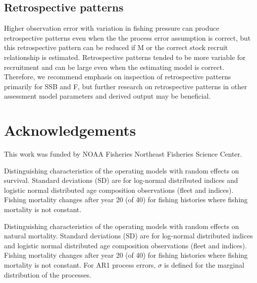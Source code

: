 \documentclass[
  12pt,
]{article}
\newlength{\cslhangindent}
\newlength{\cslentryspacingunit} %
\newenvironment{CSLReferences}[2] %
 {%
  \setlength{\parindent}{0pt}
  \ifodd #1
  \let\oldpar\par
  \def\par{\hangindent=\cslhangindent\oldpar}
  \fi
  \setlength{\parskip}{#2\cslentryspacingunit}
 }%
 {}
\begin{document}
\hypertarget{retrospective-patterns}{%
\subsection*{Retrospective patterns}\label{retrospective-patterns}}

Higher observation error with variation in fishing pressure can produce
retrospective patterns even when the the process error assumption is
correct, but this retrospective pattern can be reduced if M or the
correct stock recruit relationship is estimated. Retrospective patterns
tended to be more variable for recruitment and can be large even when
the estimating model is correct. Therefore, we recommend emphasis on
inspection of retrospective patterns primarily for SSB and F, but
further research on retrospective patterns in other assessment model
parameters and derived output may be beneficial.

\hypertarget{acknowledgements}{%
\section*{Acknowledgements}\label{acknowledgements}}

This work was funded by NOAA Fisheries Northeast Fisheries Science
Center.

\pagebreak



\hypertarget{refs}{}
\begin{CSLReferences}{0}{0}
\end{CSLReferences}

\pagebreak

\begin{landscape}
\begin{table}
\caption{Distinguishing characteristics of the operating models with random effects on survival. Standard deviations (SD) are for log-normal distributed indices and logistic normal distributed age composition observations (fleet and indices). Fishing mortality changes after year 20 (of 40) for fishing histories where fishing mortality is not constant.}\label{naa_om_table}
{\footnotesize }
\end{table}
\end{landscape}

\begin{landscape}
\begin{table}
\caption{Distinguishing characteristics of the operating models with random effects on natural mortality. Standard deviations (SD) are for log-normal distributed indices and logistic normal distributed age composition observations (fleet and indices). Fishing mortality changes after year 20 (of 40) for fishing histories where fishing mortality is not constant. For AR1 process errors, $\sigma$ is defined for the marginal distribution of the processes.}\label{M_om_table}
{}
\end{table}
\end{landscape}
\end{document}
